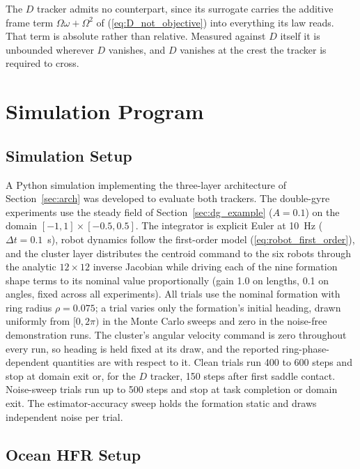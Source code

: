 \documentclass[lettersize,journal]{IEEEtran}
\begin{document}
The $D$ tracker admits no counterpart, since its surrogate carries the
additive frame term $\Omega\omega + \Omega^2$ of
(\ref{eq:D_not_objective}) into everything its law reads. That term is
absolute rather than relative. Measured against $D$ itself it is
unbounded wherever $D$ vanishes, and $D$ vanishes at the crest the
tracker is required to cross.

\section{Simulation Program}
\label{sec:methods}

\subsection{Simulation Setup}
\label{sec:sim_setup}

A Python simulation implementing the three-layer architecture of
Section~\ref{sec:arch} was developed to evaluate both trackers.
The double-gyre experiments use the steady field of
Section~\ref{sec:dg_example} ($A = 0.1$) on the domain $[-1, 1] \times
[-0.5, 0.5]$. The integrator is explicit Euler at 10~Hz ($\Delta t =
0.1$~s), robot dynamics follow the first-order model
(\ref{eq:robot_first_order}), and the cluster layer distributes the centroid
command to the six robots through the analytic $12 \times 12$ inverse
Jacobian while driving each of the nine formation shape terms to its
nominal value proportionally (gain 1.0 on lengths, 0.1 on angles, fixed
across all experiments). All trials use the nominal formation with ring
radius $\rho = 0.075$; a trial varies only the formation's initial
heading, drawn uniformly from $[0, 2\pi)$ in the Monte Carlo sweeps and
zero in the noise-free demonstration runs. The cluster's angular
velocity command is zero throughout every run, so heading is held fixed
at its draw, and the reported ring-phase-dependent quantities are with
respect to it. Clean trials run 400 to 600
steps and stop at domain exit or, for the $D$ tracker, 150 steps after
first saddle contact. Noise-sweep trials run up to 500 steps and stop
at task completion or domain exit. The estimator-accuracy sweep holds
the formation static and draws independent noise per trial. 


\subsection{Ocean HFR Setup}
\label{sec:ocean_sim}
\end{document}
